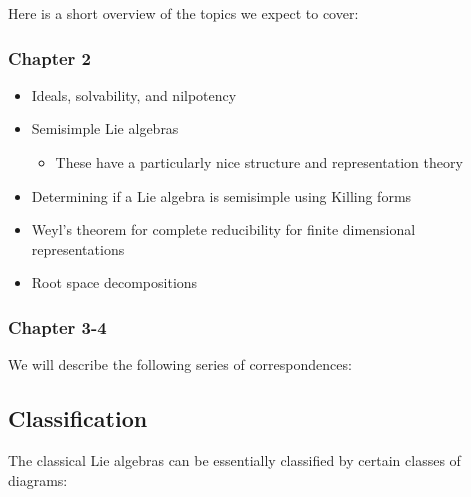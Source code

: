 Here is a short overview of the topics we expect to cover:

\hypertarget{chapter-2}{%
\subsubsection{Chapter 2}\label{chapter-2}}

\begin{itemize}
\tightlist
\item
  Ideals, solvability, and nilpotency
\item
  Semisimple Lie algebras

  \begin{itemize}
  \tightlist
  \item
    These have a particularly nice structure and representation theory
  \end{itemize}
\item
  Determining if a Lie algebra is semisimple using Killing forms
\item
  Weyl's theorem for complete reducibility for finite dimensional
  representations
\item
  Root space decompositions
\end{itemize}

\hypertarget{chapter-3-4}{%
\subsubsection{Chapter 3-4}\label{chapter-3-4}}

We will describe the following series of correspondences:


\hypertarget{classification}{%
\subsection{Classification}\label{classification}}

The classical Lie algebras can be essentially classified by certain
classes of diagrams:

